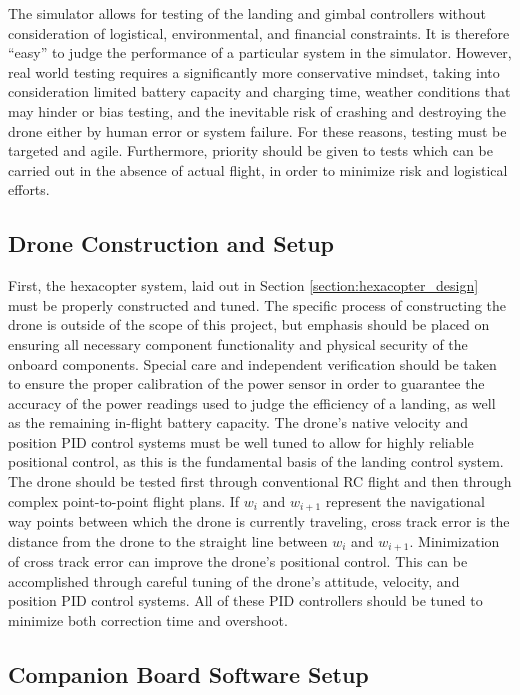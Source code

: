 \label{section:real_world_testing}
The simulator allows for testing of the landing and gimbal controllers without consideration of logistical, environmental, and financial constraints. It is therefore ``easy'' to judge the performance of a particular system in the simulator. However, real world testing requires a significantly more conservative mindset, taking into consideration limited battery capacity and charging time, weather conditions that may hinder or bias testing, and the inevitable risk of crashing and destroying the drone either by human error or system failure. For these reasons, testing must be targeted and agile. Furthermore, priority should be given to tests which can be carried out in the absence of actual flight, in order to minimize risk and logistical efforts.

\subsection{Drone Construction and Setup}

First, the hexacopter system, laid out in Section \ref{section:hexacopter_design} must be properly constructed and tuned. The specific process of constructing the drone is outside of the scope of this project, but emphasis should be placed on ensuring all necessary component functionality and physical security of the onboard components. Special care and independent verification should be taken to ensure the proper calibration of the power sensor in order to guarantee the accuracy of the power readings used to judge the efficiency of a landing, as well as the remaining in-flight battery capacity. The drone's native velocity and position PID control systems must be well tuned to allow for highly reliable positional control, as this is the fundamental basis of the landing control system. The drone should be tested first through conventional RC flight and then through complex point-to-point flight plans. If $w_i$ and $w_{i+1}$ represent the navigational way points between which the drone is currently traveling, cross track error is the distance from the drone to the straight line between $w_i$ and $w_{i+1}$. Minimization of cross track error can improve the drone's positional control. This can be accomplished through careful tuning of the drone's attitude, velocity, and position PID control systems. All of these PID controllers should be tuned to minimize both correction time and overshoot.

\subsection{Companion Board Software Setup}

